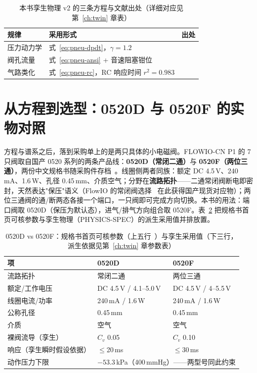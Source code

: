 \begin{table}[htbp]
  \centering
  \caption{本书孪生物理 v2 的三条方程与文献出处（详细对应见第~\ref{ch:twin} 章表）}
  \label{tab:pneu-eqs}
  \begin{tabular}{lp{4.4cm}p{2.2cm}}
    \toprule
    规律 & 采用形式 & 出处 \\
    \midrule
    压力动力学 & 式~\eqref{eq:pneu-dpdt}，$\gamma{=}1.2$ & \cite{Xavier2020AIM,Xavier2022Frontiers} \\
    阀孔流量 & 式~\eqref{eq:pneu-ansi} + 音速阻塞钳位 & \cite{Xavier2022Frontiers} \\
    气路类化 & 式~\eqref{eq:pneu-rc}，RC 响应时间 $r^2{=}0.983$ & \cite{Xavier2020AIM,Stanley2021} \\
    \bottomrule
  \end{tabular}
\end{table}

\section{从方程到选型：0520D 与 0520F 的实物对照}
\label{sec:pneu-valves}

方程与谱系之后，落到采购单上的是两只具体的小电磁阀。FLOWIO-CN P1 的 7 只阀取自国产 0520 系列的两条产品线：\textbf{0520D（常闭二通）}与 \textbf{0520F（两位三通）}，两份中文规格书随采购件存档~\cite{valve-0520d-ds,valve-0520f-ds}。线圈侧两者同族：额定 DC 4.5\,V、240\,mA、1.6\,W、孔径 0.45\,mm、介质空气；分野在\textbf{流路拓扑}——二通常闭阀断电即密封，天然表达"保压"语义（FlowIO 的常闭阀选择~\cite{Shtarbanov2021} 在此获得国产现货对应物）；两位三通阀的通/断两态各接一个端口，一只阀即可完成方向切换。本书的用法：端口阀取 0520D（保压为默认态），进气/排气方向组合取 0520F。表~\ref{tab:pneu-valves} 把规格书首页可核参数与孪生物理（PHYSICS-SPEC）的派生采用值并排放置。

\begin{table}[htbp]
  \centering
  \caption{0520D vs 0520F：规格书首页可核参数（上五行~\cite{valve-0520d-ds,valve-0520f-ds}）与孪生采用值（下三行，派生依据见第~\ref{ch:twin} 章参数表）}
  \label{tab:pneu-valves}
  \begin{tabular}{llp{5.2cm}}
    \toprule
    项 & 0520D & 0520F \\
    \midrule
    流路拓扑 & 常闭二通 & 两位三通 \\
    额定/工作电压 & DC 4.5\,V / 4.1--5.0\,V & DC 4.5\,V / 4--5.5\,V \\
    线圈电流/功率 & 240\,mA / 1.6\,W & 240\,mA / 1.6\,W \\
    公称孔径 & 0.45\,mm & 0.45\,mm \\
    介质 & 空气 & 空气 \\
    \midrule
    裸阀流导（孪生） & $C_v$ 0.05 & $C_v$ 0.10 \\
    响应（孪生瞬时假设依据） & $\le$20\,ms & $\le$30\,ms \\
    动作压力下限 & \multicolumn{2}{l}{$-53.3$\,kPa（400\,mmHg）——两型号同此约束} \\
    \bottomrule
  \end{tabular}
\end{table}

